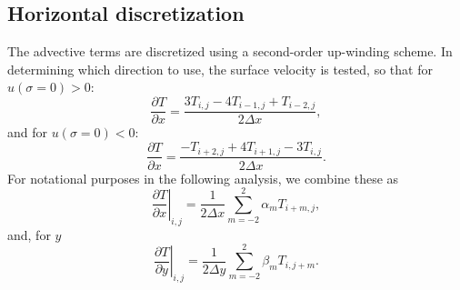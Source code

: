 \documentclass[10pt,english,a4paper]{article}
\newcommand{\diffn}[2]{\ensuremath{\frac{\partial #1}{\partial #2}}}
\begin{document}
\subsection{Horizontal discretization}
%
The advective terms are discretized using a second-order up-winding
scheme. In determining which direction to use, the surface velocity is
tested, so that for $u(\sigma=0)>0$:
%
\begin{equation}
\diffn{T}{x}=\frac{3T_{i,j}-4T_{i-1,j}+T_{i-2,j}}{2\Delta x},
\end{equation}
%
and for $u(\sigma=0)<0$:
%
\begin{equation}
\diffn{T}{x}=\frac{-T_{i+2,j}+4T_{i+1,j}-3T_{i,j}}{2\Delta x}.
\end{equation}
%
For notational purposes in the following analysis, we combine these as
%
\begin{equation}
\left.\diffn{T}{x}\right|_{i,j}=\frac{1}{2\Delta x}\sum_{m=-2}^{2}\alpha_{m}T_{i+m,j},
\end{equation}
%
and, for $y$
%
\begin{equation}
\left.\diffn{T}{y}\right|_{i,j}=\frac{1}{2\Delta y}\sum_{m=-2}^{2}\beta_{m}T_{i,j+m}.
\end{equation}
%
\end{document}
